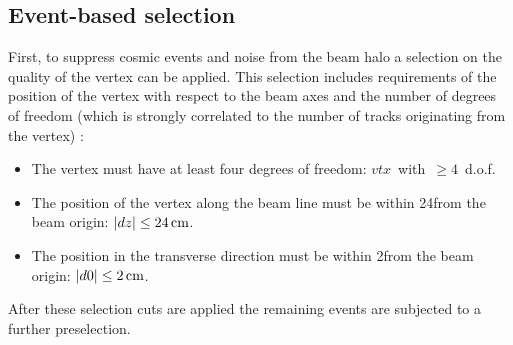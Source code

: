 \subsection{Event-based selection}
\label{sec:EventBasedSelection}
First, to suppress cosmic events and noise from the beam halo a selection on the quality of the vertex can be applied.
This selection includes requirements of the position of the vertex with respect to the beam axes and the number of degrees of freedom (which is strongly correlated to the number of tracks originating from the vertex) \cite{bib:CMS:Tracking_7TeV_PAS}:  
\begin{itemize}
\renewcommand{\labelitemi}{\footnotesize{\ding{118}}}
\item The vertex must have at least four degrees of freedom: \mbox{$vtx$ with $\geq 4$ d.o.f.}
\item The position of the vertex along the beam line must be within 24\cm from the beam origin: \mbox{$|dz| \leq 24\,\text{cm}$.}
\item The position in the transverse direction must be within 2\cm from the beam origin: \mbox{$|d0| \leq 2\,\text{cm}$.}
\end{itemize}
After these selection cuts are applied the remaining events are subjected to a further preselection.\\

